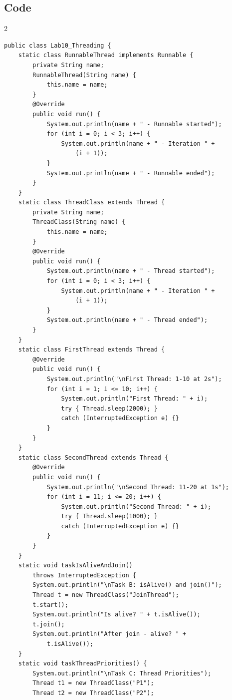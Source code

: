 \documentclass[10pt,a4paper]{article}
\begin{document}
\subsection*{Code}
\begin{multicols}{2}
\begin{lstlisting}
public class Lab10_Threading {
    static class RunnableThread implements Runnable {
        private String name;
        RunnableThread(String name) {
            this.name = name;
        }
        @Override
        public void run() {
            System.out.println(name + " - Runnable started");
            for (int i = 0; i < 3; i++) {
                System.out.println(name + " - Iteration " + 
                    (i + 1));
            }
            System.out.println(name + " - Runnable ended");
        }
    }
    static class ThreadClass extends Thread {
        private String name;
        ThreadClass(String name) {
            this.name = name;
        }
        @Override
        public void run() {
            System.out.println(name + " - Thread started");
            for (int i = 0; i < 3; i++) {
                System.out.println(name + " - Iteration " + 
                    (i + 1));
            }
            System.out.println(name + " - Thread ended");
        }
    }
    static class FirstThread extends Thread {
        @Override
        public void run() {
            System.out.println("\nFirst Thread: 1-10 at 2s");
            for (int i = 1; i <= 10; i++) {
                System.out.println("First Thread: " + i);
                try { Thread.sleep(2000); } 
                catch (InterruptedException e) {}
            }
        }
    }
    static class SecondThread extends Thread {
        @Override
        public void run() {
            System.out.println("\nSecond Thread: 11-20 at 1s");
            for (int i = 11; i <= 20; i++) {
                System.out.println("Second Thread: " + i);
                try { Thread.sleep(1000); } 
                catch (InterruptedException e) {}
            }
        }
    }
    static void taskIsAliveAndJoin() 
        throws InterruptedException {
        System.out.println("\nTask B: isAlive() and join()");
        Thread t = new ThreadClass("JoinThread");
        t.start();
        System.out.println("Is alive? " + t.isAlive());
        t.join();
        System.out.println("After join - alive? " + 
            t.isAlive());
    }
    static void taskThreadPriorities() {
        System.out.println("\nTask C: Thread Priorities");
        Thread t1 = new ThreadClass("P1");
        Thread t2 = new ThreadClass("P2");

\end{lstlisting}
\end{multicols}
\end{document}
